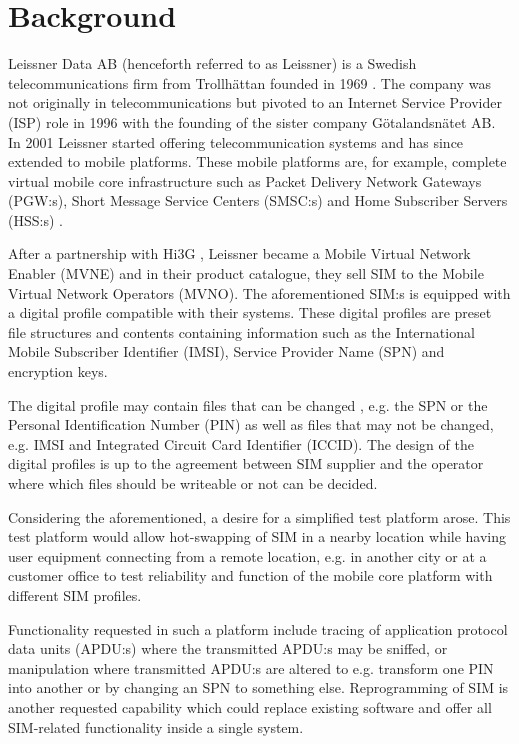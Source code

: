 \section{Background}

Leissner Data AB (henceforth referred to as Leissner) is a Swedish
telecommunications firm from Trollhättan founded in 1969 \cite{leissner-about}.
The company was not originally in telecommunications but pivoted to
an Internet Service Provider (ISP) role in 1996 with the founding
of the sister company Götalandsnätet AB. In 2001 Leissner started
offering telecommunication systems and has since extended to mobile
platforms. These mobile platforms are, for example, complete
virtual mobile core infrastructure such as Packet Delivery Network
Gateways (PGW:s), Short Message Service Centers (SMSC:s) and Home
Subscriber Servers (HSS:s) \cite{leissner-mobile-core}.

After a partnership with Hi3G \cite{leissner-about}, Leissner
became a Mobile Virtual Network Enabler (MVNE) and in their
product catalogue, they sell SIM to the Mobile Virtual Network
Operators (MVNO). The aforementioned SIM:s is equipped with a
digital profile compatible with their systems. These digital
profiles are preset file structures and contents containing
information such as the International Mobile Subscriber Identifier
(IMSI), Service Provider Name (SPN) and encryption keys.

The digital profile may contain files that can be changed \cite{placeholder-source-for-smart-card-profiles},
e.g. the SPN or the Personal Identification Number (PIN) as well as
files that may not be changed, e.g. IMSI and Integrated Circuit
Card Identifier (ICCID). The design of the digital profiles is up
to the agreement between SIM supplier and the operator where which
files should be writeable or not can be decided.

Considering the aforementioned, a desire for a simplified test
platform arose. This test platform would allow hot-swapping of
SIM in a nearby location while having user equipment connecting
from a remote location, e.g. in another city or at a customer
office to test reliability and function of the mobile core
platform with different SIM profiles.

Functionality requested in such a platform include tracing of
application protocol data units (APDU:s) where the transmitted
APDU:s may be sniffed, or manipulation where transmitted APDU:s
are altered to e.g. transform one PIN into another or by changing
an SPN to something else. Reprogramming of SIM is another
requested capability which could replace existing software and
offer all SIM-related functionality inside a single system.

